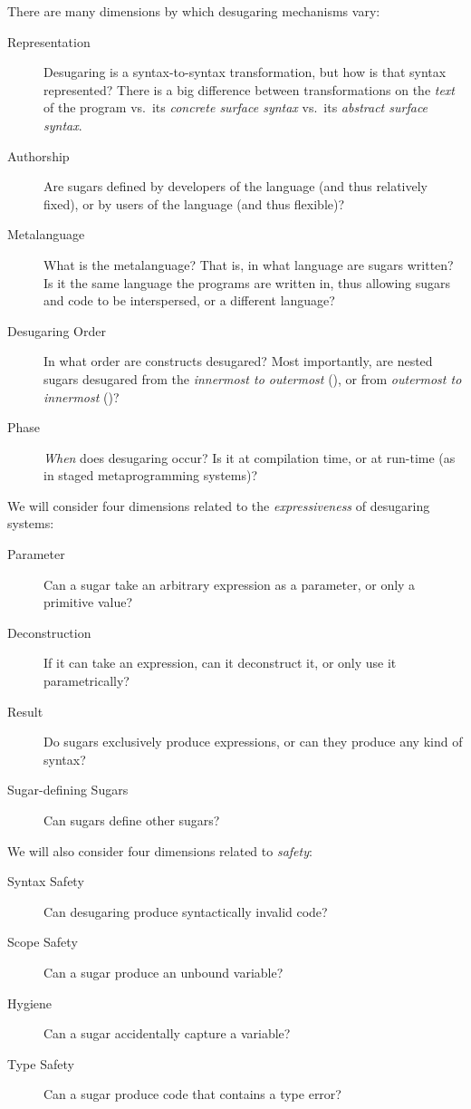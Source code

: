 There are many dimensions by which desugaring mechanisms vary:
\begin{description}
  \item[Representation] Desugaring is a syntax-to-syntax transformation, but
    how is that syntax represented? There is a big difference between
    transformations on the \emph{text} of the program vs.\ its
    \emph{concrete surface syntax} vs.\ its \emph{abstract surface
      syntax}.
  \item[Authorship] Are sugars defined by developers of the language (and thus
    relatively fixed), or by users of the language (and thus flexible)?
  \item[Metalanguage] What is the metalanguage? That is, in what language are sugars
    written? Is it the same language the programs are written in, thus
    allowing sugars and code to be interspersed, or a different
    language?
  \item[Desugaring Order] In what order are constructs desugared? Most
    importantly, are nested sugars desugared from the \emph{innermost
      to outermost} (), or from \emph{outermost to innermost}
    ()?
  \item[Phase] \emph{When} does desugaring occur? Is it at compilation time,
    or at run-time (as in staged metaprogramming
    systems)?
\end{description}
We will consider four dimensions related to the \emph{expressiveness}
of desugaring systems:
\begin{description}
  \item[Parameter] Can a sugar take an
    arbitrary expression as a parameter, or only a primitive value?
  \item[Deconstruction] If it can take an expression, can it
    deconstruct it, or only use it parametrically?
  \item[Result] Do sugars exclusively produce expressions, or can they
    produce any kind of syntax?
  \item[Sugar-defining Sugars] Can sugars define other sugars?
\end{description}
We will also consider four dimensions related to \emph{safety}:
\begin{description}
  \item[Syntax Safety] Can desugaring produce syntactically invalid
    code?
  \item[Scope Safety] Can a sugar produce an unbound variable?
  \item[Hygiene] Can a sugar accidentally capture a variable?
  \item[Type Safety] Can a sugar produce code that contains a type
    error?
\end{description}

